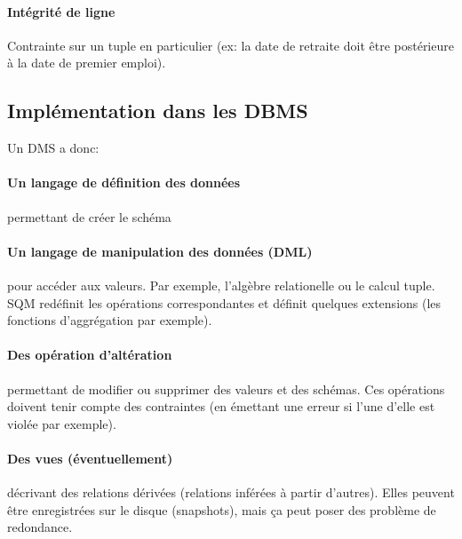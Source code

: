 \documentclass[a4paper]{article}
\begin{document}
\paragraph{Intégrité de ligne}
Contrainte sur un tuple en particulier (ex: la date de retraite doit être postérieure
à la date de premier emploi).

\subsection{Implémentation dans les DBMS}
Un DMS a donc:
\paragraph{Un langage de définition des données} permettant de créer le schéma
\paragraph{Un langage de manipulation des données (DML)} pour accéder aux valeurs.
Par exemple, l'algèbre relationelle ou le calcul tuple. SQM redéfinit les opérations
correspondantes et définit quelques extensions (les fonctions d'aggrégation par exemple).
\paragraph{Des opération d'altération} permettant de modifier ou supprimer des valeurs et des schémas.
Ces opérations doivent tenir compte des contraintes (en émettant une erreur si l'une d'elle est violée par exemple).
\paragraph{Des vues (éventuellement)} décrivant des relations dérivées
(relations inférées à partir d'autres). Elles peuvent être enregistrées sur le
disque (snapshots), mais ça peut poser des problème de redondance.
\end{document}
